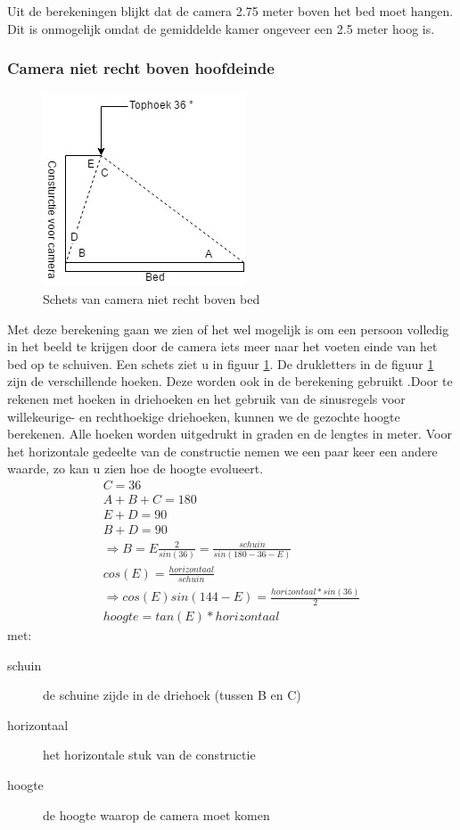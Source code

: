 Uit de berekeningen blijkt dat de camera 2.75 meter boven het bed moet hangen. Dit is onmogelijk omdat de gemiddelde kamer ongeveer een 2.5 meter hoog is.

\subsubsection{Camera niet recht boven hoofdeinde}
\begin{figure}[hbp]
	\includegraphics[scale=0.7]{CameraNietRechtBoven}
	\caption{Schets van camera niet recht boven bed}
	\label{imgCNRBB}
\end{figure}
Met deze berekening gaan we zien of het wel mogelijk is om een persoon volledig in het beeld te krijgen door de camera iets meer naar het voeten einde van het bed op te schuiven. Een schets ziet u in figuur \ref{imgCNRBB}. De drukletters in de figuur \ref{imgCNRBB} zijn de verschillende hoeken. Deze worden ook in de berekening gebruikt .Door te rekenen met hoeken in driehoeken en het gebruik van de sinusregels voor willekeurige- en rechthoekige driehoeken, kunnen we de gezochte hoogte berekenen. Alle hoeken worden uitgedrukt in graden en de lengtes in meter. Voor het horizontale gedeelte van de constructie nemen we een paar keer een andere waarde, zo kan u zien hoe de hoogte evolueert.
\begin{gather}
C=36\\
A+B+C=180 \\
E+D=90 \\
B+D=90 \\
\Rightarrow B=E
\frac{2}{sin(36)}=\frac{schuin}{sin(180-36-E)}\\
cos(E)=\frac{horizontaal}{schuin}\\
\Rightarrow cos(E)sin(144-E)=\frac{horizontaal*sin(36)}{2}\\
hoogte=tan(E)*horizontaal
\end{gather}
met:
\begin{description}
	\item[schuin] de schuine zijde in de driehoek (tussen B en C)
	\item[horizontaal] het horizontale stuk van de constructie
	\item[hoogte] de hoogte waarop de camera moet komen
\end{description}
